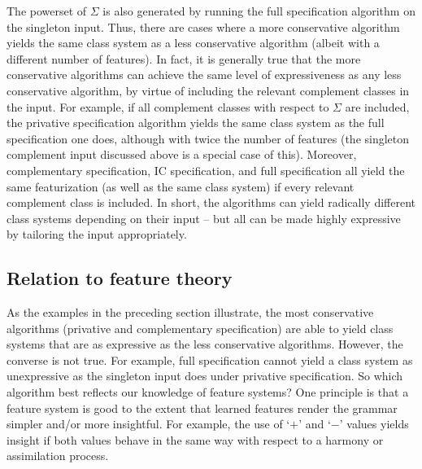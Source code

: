 \documentclass[12pt, oneside]{article}   	%
\begin{document}
The powerset of $\Sigma$ is also generated by running the full specification algorithm on the singleton input. Thus, there are cases where a more conservative algorithm yields the same class system as a less conservative algorithm (albeit with a different number of features). In fact, it is generally true that the more conservative algorithms can achieve the same level of expressiveness as any less conservative algorithm, by virtue of including the relevant complement classes in the input. For example, if all complement classes with respect to $\Sigma$ are included, the privative specification algorithm yields the same class system as the full specification one does, although with twice the number of features (the singleton complement input discussed above is a special case of this). Moreover, complementary specification, IC specification, and full specification all yield the same featurization (as well as the same class system) if every relevant complement class is included. In short, the algorithms can yield radically different class systems depending on their input -- but all can be made highly expressive by tailoring the input appropriately.

\subsection{Relation to feature theory}

As the examples in the preceding section illustrate, the most conservative algorithms (privative and complementary specification) are able to yield class systems that are as expressive as the less conservative algorithms. However, the converse is not true. For example, full specification cannot yield a class system as unexpressive as the singleton input does under privative specification. So which algorithm best reflects our knowledge of feature systems? One principle is that a feature system is good to the extent that learned features render the grammar simpler and/or more insightful. For example, the use of `$+$' and `$-$' values yields insight if both values behave in the same way with respect to a harmony or assimilation process.
\end{document}
